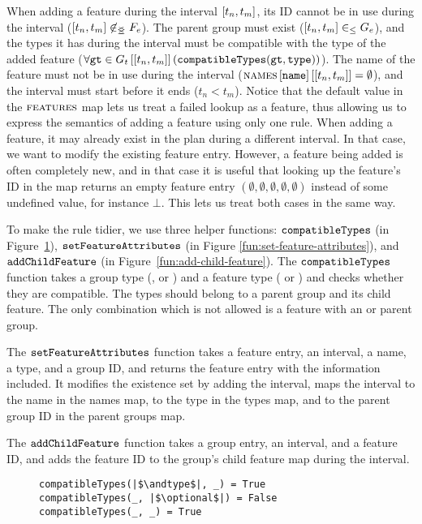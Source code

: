 When adding a feature during the interval $\interval{t_n}{t_m}$, its ID cannot be in use during the interval ($\interval{t_n}{t_m} \not \innr F_e$). The parent group must exist ($\interval{t_n}{t_m} \inn G_e$), and the types it has during the interval must be compatible with the type of the 
added feature ($\forall \var{gt} \in \lookup{G_t}{\interval{t_n}{t_m}} (\var{compatibleTypes}(\var{gt}, \var{type}))$). The name of the feature must not be in use during the interval ($\lookup{\lookup{\names{}}{\var{name}}}{\interval{t_n}{t_m}} = \emptyset$), and the interval must start before it ends ($t_n < t_m$). Notice that the default value in the $\textsc{features}{}$ map lets us treat a failed lookup as a feature, thus allowing us to express the semantics of adding a feature using only one rule. When adding a feature, it may already exist in the plan during a different interval. In that case, we want to modify the existing feature entry. However, a feature being added is often completely new, and in that case it is useful that looking up the feature's ID in the \features{} map returns an empty feature entry $(\emptyset, \emptyset, \emptyset, \emptyset, \emptyset)$ instead of some undefined value, for instance $\bot$. This lets us treat both cases in the same way.

To make the rule tidier, we use three helper functions: $\texttt{compatibleTypes}$ (in Figure~\ref{fun:compatible-types}), $\texttt{setFeatureAttributes}$ (in Figure \ref{fun:set-feature-attributes}), and $\texttt{addChildFeature}$ (in Figure~\vref{fun:add-child-feature}). The $\texttt{compatibleTypes}$ function takes a group type (\andtype{}, \ortype{} or \xortype{}) and a feature type (\mandatory{} or \optional{}) and checks whether they are compatible. The types should belong to a parent group and its child feature. The only combination which is not allowed is a \mandatory{} feature with an \xortype{} or \ortype{} parent group.

The $\texttt{setFeatureAttributes}$ function takes a feature entry, an interval, a name, a type, and a group ID, and returns the feature entry with the information included. It modifies the existence set by adding the interval, maps the interval to the name in the names map, to the type in the types map, and to the parent group ID in the parent groups map.

The $\texttt{addChildFeature}$ function takes a group entry, an interval, and a feature ID, and adds the feature ID to the group's child feature map during the interval.

\begin{figure}[h]
  \begin{verbatim}
compatibleTypes(|$\andtype$|, _) = True
compatibleTypes(_, |$\optional$|) = False
compatibleTypes(_, _) = True
  \end{verbatim}
  \caption{}
  \label{fun:compatible-types}
\end{figure}

